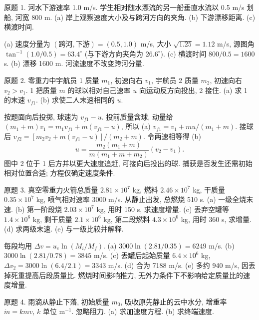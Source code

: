 \begin{exercise}
原题 1. 河水下游速率 1.0 m/s. 学生相对随水漂流的另一船垂直水流以 0.5 m/s 划船, 河宽 800 m. (a) 岸上观察速度大小及与跨河方向的夹角. (b) 下游漂移距离. (c) 横渡时间.
\end{exercise}
\begin{solution}
(a) 速度分量为 $(\text{跨河},\text{下游})=(0.5,1.0)$ m/s, 大小 $\sqrt{1.25}=1.12$ m/s, 源图角 $\tan^{-1}(1.0/0.5)=63.4^\circ$ (与下游方向夹角为 $26.6^\circ$). (c) 横渡时间 $800/0.5=1600$ s. (b) 漂移 1600 m. 河流速度不改变跨河分量.
\end{solution}
\begin{exercise}
原题 2. 零重力中宇航员 1 质量 $m_1$, 初速向右 $v_1$, 宇航员 2 质量 $m_2$, 初速向右 $v_2>v_1$. 1 把质量 $m$ 的球以相对自己速率 $u$ 向运动反方向投出, 2 接住. (a) 求 1 的末速 $v_{f1}$. (b) 求使二人末速相同的 $u$.
\end{exercise}
\begin{solution}
按题面向后投掷, 球速为 $v_{f1}-u$. 投前质量含球, 动量给 $(m_1+m)v_1=m_1v_{f1}+m(v_{f1}-u)$, 所以 (a) $v_{f1}=v_1+mu/(m_1+m)$. 接球后 $v_{f2}=[m_2v_2+m(v_{f1}-u)]/(m_2+m)$. 令两速相等得 (b)
\begin{equation}
u=\frac{m_2(m_1+m)}{m(m_1+m+m_2)}(v_2-v_1).
\end{equation}
图中 2 位于 1 后方并以更大速度追赶, 可接向后投出的球. 捕获是否发生还需初始相对位置合适; 方程仅确定速度条件.
\end{solution}
\begin{exercise}
原题 3. 真空零重力火箭总质量 $2.81\times10^7$ kg, 燃料 $2.46\times10^7$ kg, 干质量 $0.35\times10^7$ kg, 喷气相对速率 3000 m/s. 从静止出发, 总燃烧 510 s. (a) 一级全烧末速. (b) 第一阶段烧 $2.03\times10^7$ kg, 用时 150 s, 求速度增量. (c) 丢弃空罐等 $1.4\times10^6$ kg, 剩干质量 $2.1\times10^6$ kg, 第二段燃料 $4.3\times10^6$ kg, 用时 360 s, 求增量. (d) 求两级末速. (e) 与一级比较并解释.
\end{exercise}
\begin{solution}
每段均用 $\Delta v=u_e\ln(M_i/M_f)$. (a) $3000\ln(2.81/0.35)=6249$ m/s. (b) $3000\ln(2.81/0.78)=3845$ m/s. (c) 丢罐后起始质量 $6.4\times10^6$ kg, $\Delta v_2=3000\ln(6.4/2.1)=3343$ m/s. (d) 合为 7188 m/s. (e) 多约 940 m/s, 因丢掉死重提高后段质量比. 燃烧时间影响推力, 无外力条件下不影响给定质量比的速度增量.
\end{solution}
\begin{exercise}
原题 4. 雨滴从静止下落, 初始质量 $m_0$, 吸收原先静止的云中水分, 增重率 $\dot m=kmv$, $k$ 单位 m$^{-1}$. 忽略阻力. (a) 求加速度方程. (b) 求终端速度.
\end{exercise}

